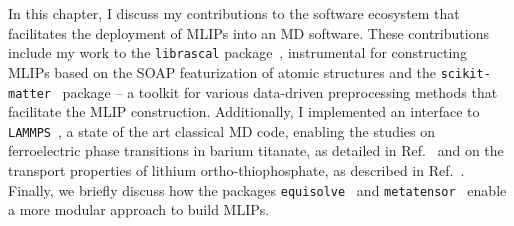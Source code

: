 In this chapter, I discuss my contributions to the software ecosystem that facilitates the deployment of MLIPs into an MD software.
These contributions include my work to the \texttt{librascal} package~\cite{LIBRASCAL}, instrumental for constructing MLIPs based on the SOAP featurization of atomic structures and the \texttt{scikit-matter}~\cite{goscinski2023scikit} package -- a toolkit for various data-driven preprocessing methods that facilitate the MLIP construction. %
Additionally, I implemented an interface to \texttt{LAMMPS}~\cite{LAMMPS}, a state of the art classical MD code, enabling the studies on ferroelectric phase transitions in barium titanate, as detailed in Ref.~\cite{gigli2023modeling} and on the transport properties of lithium ortho-thiophosphate, as described in Ref.~\cite{gigli2023mechanism}.
Finally, we briefly discuss how the packages \texttt{equisolve}~\cite{equisolve} and \texttt{metatensor}~\cite{metatensor} enable a more modular approach to build MLIPs.

